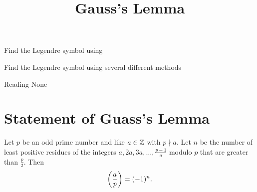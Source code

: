 \documentclass{ximera}
\title{Gauss's Lemma}
\begin{document}
\begin{abstract}
\end{abstract}
\maketitle


\begin{obj}
    \item Find the Legendre symbol using 
	\item Find the Legendre symbol using several different methods
\end{obj}


\begin{pre}
    \item[Reading] None
\end{pre}


\section{Statement of Guass's Lemma}
\begin{lemma}\label{lem:gauss}
	Let $p$ be an odd prime number and like $a\in\mathbb Z$ with $p\nmid a$. Let $n$ be the number of least positive residues of the integers $a,2a,3a,\dots,\frac{p-1}{a}$ modulo $p$ that are greater than $\frac{p}{2}.$ Then \[\left(\frac{a}{p}\right)=(-1)^n.\]
\end{lemma}
\end{document}
